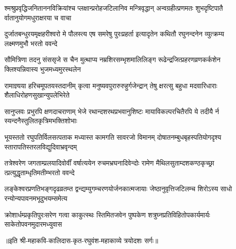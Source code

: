 \fourlineindentedshloka
{श्मश्रुप्रवृद्धिजनिताननविक्रियांश्च}
{प्लक्षान्प्ररोहजटिलानिव मन्त्रिवृद्धान्}
{अन्वग्रहीत्प्रणमतः शुभदृष्टिपातै}
{र्वातानुयोगमधुराक्षरया च वाचा} %

\fourlineindentedshloka
{दुर्जातबन्धुरयमृक्षहरीश्वरो मे}
{पौलस्त्य एष समरेषु पुरःप्रहर्ता}
{इत्यादृतेन कथितौ रघुनन्दनेन}
{व्युत्क्रम्य लक्ष्मणमुभौ भरतो ववन्दे} %

\fourlineindentedshloka
{सौमित्रिणा तदनु संससृजे स चैन}
{मुत्थाप्य नम्रशिरसम्भृशमालिलिङ्ग}
{रूढेन्द्रजित्प्रहरणव्रणकर्कशेन}
{क्लिश्यन्निवास्य भुजमध्यमुरस्थलेन} %

\fourlineindentedshloka
{रामाज्ञ्यया हरिचमूपतयस्तदानीम्}
{कृत्वा मनुष्यवपुरारुरुहुर्गजेन्द्रान्}
{तेषु क्षरत्सु बहुधा मदवारिधाराः}
{शैलाधिरोहणसुखान्युपलेभिरेते} %

\fourlineindentedshloka
{सानुप्लवः प्रभुरपि क्षणदाचराणाम्}
{भेजे रथान्दशरथप्रभवानुशिष्टः}
{मायाविकल्परचितैरपि ये तदीयै}
{र्न स्यन्दनैस्तुलितकृत्रिमभक्तिशोभाः} %

\fourlineindentedshloka
{भूयस्ततो रघुपतिर्विलसत्पताक}
{मध्यास्त कामगति सावरजो विमानम्}
{दोषातनम्बुधबृहस्पतियोगदृश्य}
{स्तारापतिस्तरलविद्युदिवाभ्रवृन्दम्} %

\fourlineindentedshloka
{तत्रेश्वरेण जगताम्प्रलयादिवोर्वीं}
{वर्षात्ययेन रुचमभ्रघनादिवेन्दोः}
{रामेण मैथिलसुताम्दशकण्ठकृच्छ्रा}
{त्प्रत्युद्धृताम्धृतिमतीम्भरतो ववन्दे} %

\fourlineindentedshloka
{लङ्केश्वरप्रणतिभङ्गदृढव्रतम्त}
{द्वन्द्यम्युगम्चरणयोर्जनकात्मजायाः}
{जेष्ठानुवृत्तिजटिलम्च शिरोऽस्य साधो}
{रन्योन्यपावनमभूदुभयम्समेत्य} %

\fourlineindentedshloka
{क्रोशार्धम्प्रकृतिपुरःसरेण गत्वा}
{काकुत्स्थः स्तिमितजवेन पुष्पकेण}
{शत्रुघ्नप्रतिविहितोपकार्यमार्यः}
{साकेतोपवनमुदारमध्युवास} %

॥इति श्री-महाकवि-कालिदास-कृत-रघुवंश-महाकाव्ये त्रयोदशः सर्गः॥
